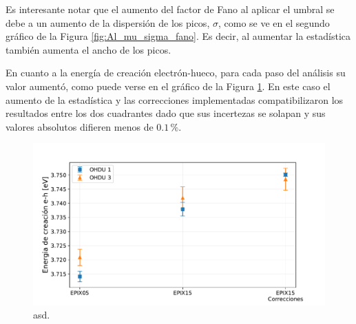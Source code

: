 Es interesante notar que el aumento del factor de Fano al aplicar el umbral se debe a un aumento de la dispersión de los picos, $\sigma$, como se ve en el segundo gráfico de la Figura \ref{fig:Al_mu_sigma_fano}. Es decir, al aumentar la estadística también aumenta el ancho de los picos.

En cuanto a la energía de creación electrón-hueco, para cada paso del análisis su valor aumentó, como puede verse en el gráfico de la Figura \ref{fig:Al_energia_creacion_eh}. En este caso el aumento de la estadística y las correcciones implementadas compatibilizaron los resultados entre los dos cuadrantes dado que sus incertezas se solapan y sus valores absolutos difieren menos de $0.1\,\%$.
\begin{figure}[h]
    \centering
        \includegraphics[scale=0.5]{Figs/Al_energia_creacion_eh.pdf}
    \caption{\footnotesize{asd.}}
    \label{fig:Al_energia_creacion_eh}
\end{figure}


